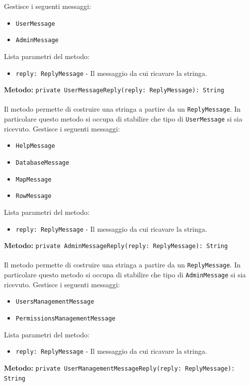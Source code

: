 \documentclass[a4paper]{article}
\begin{document}
			Gestisce i seguenti messaggi:
			\begin{itemize}
				\item \texttt{UserMessage}
				\item \texttt{AdminMessage}
			\end{itemize}
			Lista parametri del metodo:
			\begin{itemize}
				\item \texttt{reply: ReplyMessage} - Il messaggio da cui ricavare la stringa.
			\end{itemize}
		\textbf{Metodo: }\texttt{private UserMessageReply(reply: ReplyMessage): String}
			\\ \\
			Il metodo permette di costruire una stringa a partire da un \texttt{ReplyMessage}. In particolare questo metodo si occupa di stabilire che tipo di \texttt{UserMessage} si sia ricevuto.
			Gestisce i seguenti messaggi:
			\begin{itemize}
				\item \texttt{HelpMessage}
				\item \texttt{DatabaseMessage}
				\item \texttt{MapMessage}
				\item \texttt{RowMessage}
			\end{itemize}
			Lista parametri del metodo:
			\begin{itemize}
				\item \texttt{reply: ReplyMessage} - Il messaggio da cui ricavare la stringa.
			\end{itemize}
		\textbf{Metodo: }\texttt{private AdminMessageReply(reply: ReplyMessage): String}
			\\ \\
			Il metodo permette di costruire una stringa a partire da un \texttt{ReplyMessage}. In particolare questo metodo si occupa di stabilire che tipo di \texttt{AdminMessage} si sia ricevuto.
			Gestisce i seguenti messaggi:
			\begin{itemize}
				\item \texttt{UsersManagementMessage}
				\item \texttt{PermissionsManagementMessage}
			\end{itemize}
			Lista parametri del metodo:
			\begin{itemize}
				\item \texttt{reply: ReplyMessage} - Il messaggio da cui ricavare la stringa.
			\end{itemize}
		\textbf{Metodo: }\texttt{private UserManagementMessageReply(reply: ReplyMessage): String}
\end{document}
